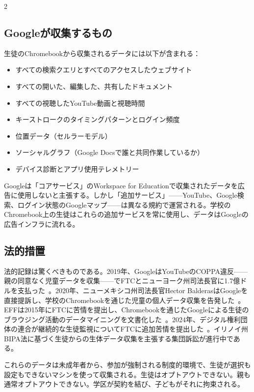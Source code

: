\documentclass[11pt, a4paper]{article}
\begin{document}
\begin{multicols}{2}
\subsection{Googleが収集するもの}

生徒のChromebookから収集されるデータには以下が含まれる：

\begin{itemize}
  \item すべての検索クエリとすべてのアクセスしたウェブサイト
  \item すべての開いた、編集した、共有したドキュメント
  \item すべての視聴したYouTube動画と視聴時間
  \item キーストロークのタイミングパターンとログイン頻度
  \item 位置データ（セルラーモデル）
  \item ソーシャルグラフ（Google Docsで誰と共同作業しているか）
  \item デバイス診断とアプリ使用テレメトリー
\end{itemize}

Googleは「コアサービス」のWorkspace for Educationで収集されたデータを広告に使用しないと主張する。しかし「追加サービス」——YouTube、Google検索、ログイン状態のGoogleマップ——は異なる規約で運営される。学校のChromebook上の生徒はこれらの追加サービスを常に使用し、データはGoogleの広告インフラに流れる。

\subsection{法的措置}

法的記録は驚くべきものである。2019年、GoogleはYouTubeのCOPPA違反——親の同意なく児童データを収集——でFTCとニューヨーク州司法長官に1.7億ドルを支払った~\citep{google2019coppa}。2020年、ニューメキシコ州司法長官Hector BalderasはGoogleを直接提訴し、学校のChromebookを通じた児童の個人データ収集を告発した~\citep{newmexico2020google}。EFFは2015年にFTCに苦情を提出し、Chromebookを通じたGoogleによる生徒のブラウジング活動のデータマイニングを文書化した~\citep{eff2015chromebook}。2024年、デジタル権利団体の連合が継続的な生徒監視についてFTCに追加苦情を提出した~\citep{eff2024monitoring}。イリノイ州BIPA法に基づく生徒からの生体データ収集を主張する集団訴訟が進行中である。

これらのデータは未成年者から、参加が強制される制度的環境で、生徒が選択も設定もできないマシンを使って収集される。生徒はオプトアウトできない。親も通常オプトアウトできない。学区が契約を結び、子どもがそれに拘束される。


\end{multicols}
\end{document}
